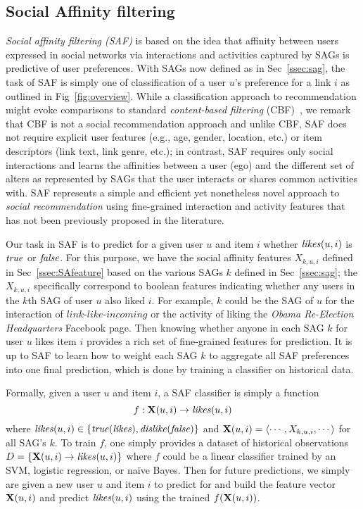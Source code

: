 
\subsection{Social Affinity filtering}

\emph{Social affinity filtering (SAF)} is based on the idea that
affinity between users expressed in social networks via interactions
and activities captured by SAGs is predictive of user preferences.
With SAGs now defined as in Sec~\ref{ssec:sag}, the task of SAF is
simply one of classification of a user $u$'s preference for a link $i$
as outlined in Fig~\ref{fig:overview}.  While a classification
approach to recommendation might evoke comparisons to standard
\emph{content-based filtering} (CBF)~\cite{newsweeder}, we remark that
CBF is not a social recommendation approach and unlike CBF, SAF does
not require explicit user features (e.g., age, gender, location, etc.)
or item descriptors (link text, link genre, etc.); in contrast, SAF
requires only social interactions and learns the affinities between a
user (ego) and the different set of alters as represented by SAGs that
the user interacts or shares common activities with.  SAF represents a
simple and efficient yet nonetheless novel approach to \emph{social
  recommendation} using fine-grained interaction and activity features
that has not been previously proposed in the literature.

Our task in SAF is to predict for a given user $u$ and item $i$
whether $\likes(u,i)$ is $\true$ or $\false$.  For this purpose,
we have the social affinity features $X_{k,u,i}$ defined in 
Sec~\ref{ssec:SAfeature} based on the various SAGs $k$ defined in 
Sec~\ref{ssec:sag}; the $X_{k,u,i}$ specifically correspond to boolean 
features indicating whether any users in the $k$th SAG of
user $u$ also liked $i$.  For example, $k$ could be the SAG of $u$ for
the interaction of $\textit{link-like-incoming}$ or the activity of
liking the {\em Obama Re-Election Headquarters} Facebook page.  Then knowing whether
anyone in each SAG $k$ for user $u$ likes item $i$ provides a rich set
of fine-grained features for prediction.  It is up to SAF to learn how
to weight each SAG $k$ to aggregate all SAF preferences into one final
prediction, which is done by training a classifier on historical data.

Formally, given a user $u$ and item $i$, a SAF classifier is simply a
function $$f: \x(u,i) \to \likes(u,i)$$ where $\likes(u,i) \in \{ \true
(\like), \dislike (\false) \}$ and $\x(u,i) = \langle
\cdots,X_{k,u,i},\cdots \rangle$ for all SAG's $k$.  To train $f$, one
simply provides a dataset of historical observations $D = \{ 
\x(u,i) \to \likes(u,i) \}$ where $f$ could be a linear
classifier trained by an SVM, logistic regression, or na\"{i}ve Bayes.
Then for future predictions, we simply are given a new user $u$ and
item $i$ to predict for and build the feature vector $\x(u,i)$ and 
predict $\likes(u,i)$ using the trained $f(\x(u,i))$.

